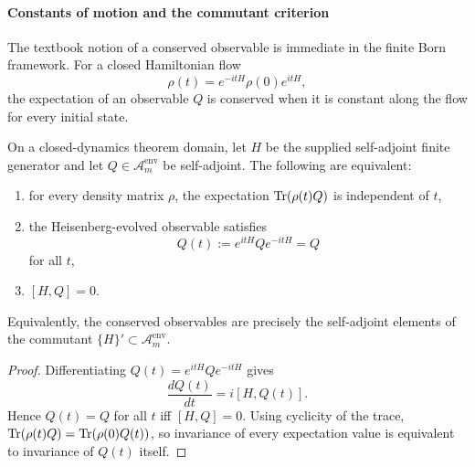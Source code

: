 \documentclass[12pt,a4paper]{article}
\begin{document}
\paragraph{Constants of motion and the commutant criterion}
\label{p4:sec:part2-constants-of-motion}

The textbook notion of a conserved observable is immediate in the finite Born framework.
For a closed Hamiltonian flow
\begin{equation}
\label{p4:eq:state-flow-H}
\rho(t)=e^{-itH}\rho(0)e^{itH},
\end{equation}
the expectation of an observable \(Q\) is conserved when it is constant along the flow for every initial state.


\begin{theorem}
\label{p4:thm:constants-of-motion}
On a closed-dynamics theorem domain, let \(H\) be the supplied self-adjoint finite generator and let \(Q\in\mathcal A_m^{\mathrm{env}}\) be self-adjoint.
The following are equivalent:
\begin{enumerate}[label=(\roman*), leftmargin=2em]
\item for every density matrix \(\rho\), the expectation \(\operatorname{Tr}(\rho(t)Q)\) is independent of \(t\),
\item the Heisenberg-evolved observable satisfies
\begin{equation}
\label{p4:eq:heisenberg-invariant}
Q(t):=e^{itH}Qe^{-itH}=Q
\end{equation}
for all \(t\),
\item \([H,Q]=0\).
\end{enumerate}
Equivalently, the conserved observables are precisely the self-adjoint elements of the commutant \(\{H\}'\subset\mathcal A_m^{\mathrm{env}}\).
\end{theorem}


\begin{proof}
Differentiating \(Q(t)=e^{itH}Qe^{-itH}\) gives
\begin{equation}
\label{p4:eq:heisenberg-derivative}
\frac{dQ(t)}{dt}=i[H,Q(t)].
\end{equation}
Hence \(Q(t)=Q\) for all \(t\) iff \([H,Q]=0\).
Using cyclicity of the trace,
\(
\operatorname{Tr}(\rho(t)Q)=\operatorname{Tr}(\rho(0)Q(t))
\),
so invariance of every expectation value is equivalent to invariance of \(Q(t)\) itself.
\end{proof}
\end{document}

